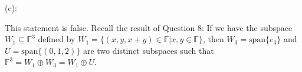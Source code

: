 \documentclass{article}
\theoremstyle{plain} %
\numberwithin{thm}{section} %
\theoremstyle{definition}
\begin{document}
\begin{question}{11}
        \medskip

        (c):

        This statement is false. Recall the result of Question 8: If we have the subspace \(W_1 \subseteq \mathbb{F}^3\) defined by \(W_1 = \{ (x,y,x+y) \in \mathbb{F} | x,y \in \mathbb{F} \}\), then \(W_3 = \mathrm{span} \{ e_3 \}\) and \(U = \mathrm{span} \{ (0,1,2) \}\) are two distinct subspaces such that \(\mathbb{F}^3 = W_1 \oplus W_3 = W_1 \oplus U\).
    \end{question}
\end{document}
